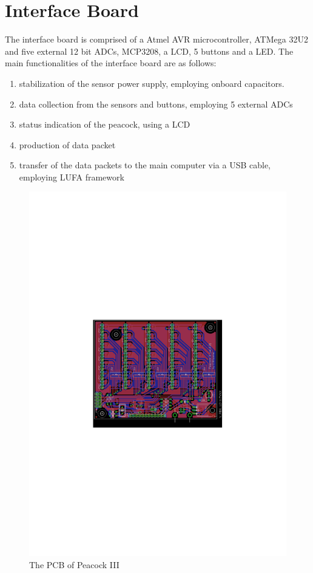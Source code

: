 \documentclass{nime-alternate}
\begin{document}
\section{Interface Board} %

The interface board is comprised of a Atmel AVR microcontroller, ATMega 32U2 and five external 12 bit ADCs, MCP3208, a LCD, 5 buttons and a LED. The main functionalities of the interface board are as follows:

\begin{enumerate}
       \item stabilization of the sensor power supply, employing onboard capacitors.
       \item data collection from the sensors and buttons, employing 5 external ADCs
       \item status indication of the peacock, using a LCD
       \item production of data packet 
       \item transfer of the data packets to the main computer via a USB cable, employing LUFA framework
\end{enumerate}

\begin{figure}[htbp]
       \centering
              \includegraphics[width=1\columnwidth]{board}
       \caption{The PCB of Peacock III}
       \label{fig:board}
\end{figure}
\end{document}
